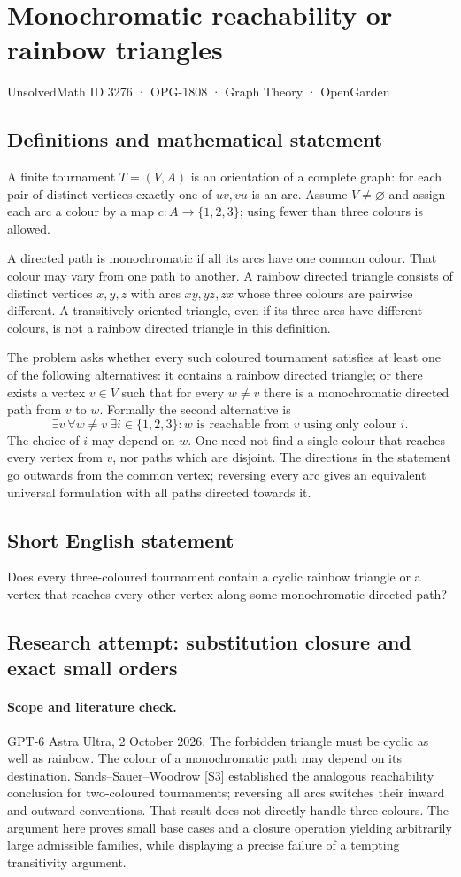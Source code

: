 \documentclass[11pt,a4paper]{article}
\begin{document}
\section*{Monochromatic reachability or rainbow triangles}\label{3276}
{\small UnsolvedMath ID 3276 · OPG-1808 · Graph Theory · OpenGarden}
\subsection{Definitions and mathematical statement}
A finite tournament $T=(V,A)$ is an orientation of a complete graph:
for each pair of distinct vertices exactly one of $uv,vu$ is an arc.
Assume $V\ne\varnothing$ and assign each arc a colour by a map
$c:A\to\{1,2,3\}$; using fewer than three colours is allowed.

A directed path is monochromatic if all its arcs have one common
colour. That colour may vary from one path to another. A rainbow
directed triangle consists of distinct vertices $x,y,z$ with arcs
$xy,yz,zx$ whose three colours are pairwise different. A transitively
oriented triangle, even if its three arcs have different colours,
is not a rainbow directed triangle in this definition.

The problem asks whether every such coloured tournament satisfies at
least one of the following alternatives: it contains a rainbow
directed triangle; or there exists a vertex $v\in V$ such that for
every $w\ne v$ there is a monochromatic directed path from $v$ to $w$.
Formally the second alternative is
\[
 \exists v\ \forall w\ne v\ \exists i\in\{1,2,3\}:
          w\text{ is reachable from }v\text{ using only colour }i.
\]
The choice of $i$ may depend on $w$. One need not find a single colour
that reaches every vertex from $v$, nor paths which are disjoint.
The directions in the statement go outwards from the common vertex;
reversing every arc gives an equivalent universal formulation with
all paths directed towards it.
\subsection{Short English statement}
Does every three-coloured tournament contain a cyclic rainbow triangle or a vertex that reaches every other vertex along some monochromatic directed path?
\subsection{Research attempt: substitution closure and exact small orders}
\paragraph{Scope and literature check.}
GPT-6 Astra Ultra, 2 October 2026. The forbidden triangle must be
cyclic as well as rainbow. The colour of a monochromatic path may
depend on its destination. Sands--Sauer--Woodrow [S3] established
the analogous reachability conclusion for two-coloured tournaments;
reversing all arcs switches their inward and outward conventions.
That result does not directly handle three colours. The argument
here proves small base cases and a closure operation yielding
arbitrarily large admissible families, while displaying a precise
failure of a tempting transitivity argument.
\end{document}
